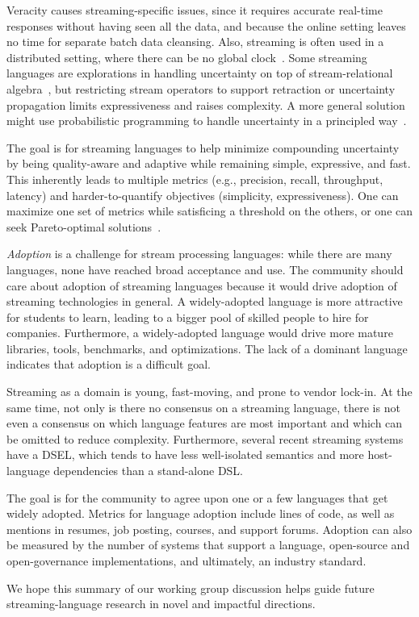 Veracity causes streaming-specific issues, since it requires accurate
real-time responses without having seen all the data, and because the
online setting leaves no time for separate batch data cleansing. Also,
streaming is often used in a distributed setting, where there can be
no global clock~\cite{lamport_1978}. Some streaming languages are
explorations in handling uncertainty on top of stream-relational
algebra~\cite{ali_et_al_2009,tran_et_al_2010}, but restricting stream
operators to support retraction or uncertainty propagation limits
expressiveness and raises complexity. A more general solution might use
probabilistic programming to handle uncertainty in a principled
way~\cite{gordon_et_al_2014}.

The goal is for streaming languages to help minimize compounding
uncertainty by being quality-aware and adaptive while remaining
simple, expressive, and fast. This inherently leads to multiple
metrics (e.g., precision, recall, throughput, latency) and
harder-to-quantify objectives (simplicity, expressiveness). One can
maximize one set of metrics while satisficing a threshold on the
others, or one can seek Pareto-optimal
solutions~\cite{zhang_hirzel_grove_2016}.

\emph{Adoption} is a challenge for stream processing languages: while
there are many languages, none have reached broad acceptance and use.
The community should care about adoption of streaming languages
because it would drive adoption of streaming technologies in general.
A widely-adopted language is more attractive for students to learn,
leading to a bigger pool of skilled people to hire for companies.
Furthermore, a widely-adopted language would drive more
mature libraries, tools, benchmarks, and optimizations. The lack of a
dominant language indicates that adoption is a difficult goal.

Streaming as a domain is young, fast-moving, and prone to vendor
lock-in. At the same time, not only is there no consensus on a
streaming language, there is not even a consensus on which language
features are most important and which can be omitted to reduce
complexity. Furthermore, several recent streaming systems have a DSEL,
which tends to have less well-isolated semantics and more
host-language dependencies than a stand-alone DSL.

The goal is for the community to agree upon one or a few languages that get
widely adopted. Metrics for language adoption include lines of code,
as well as mentions in resumes, job posting, courses, and support
forums. Adoption can also be measured by the number of systems that
support a language, open-source and open-governance implementations,
and ultimately, an industry standard.

We hope this summary of our working group discussion helps guide
future streaming-language research in novel and impactful directions.
